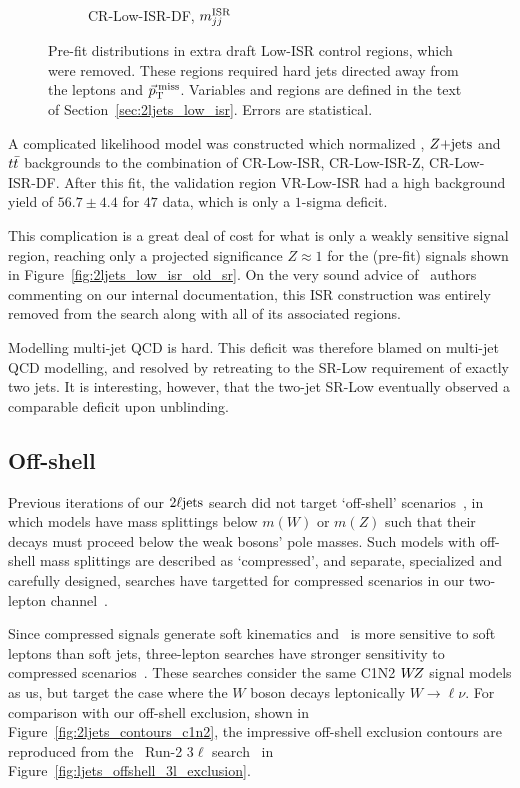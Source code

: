 \begin{figure}[tp]
\begin{subfigure}{0.48\textwidth}
\caption{CR-Low-ISR-DF, $m_{jj}^\mathrm{ISR}$}
\end{subfigure}
\caption[
Pre-fit distributions in extra draft Low-ISR control regions, which were
removed
]{%
Pre-fit distributions in extra draft Low-ISR control regions, which were
removed.
These regions required hard jets directed away from the leptons and $\vec p_\mathrm{T}^\mathrm{\:miss}$.
Variables and regions are defined in the text of
Section~\ref{sec:2ljets_low_isr}.
Errors are statistical.
}
\label{fig:2ljets_low_isr_old_more}
\end{figure}

A complicated likelihood model was constructed which normalized \diboson,
$Z\mathrm{+jets}$ and $t\bar t$ backgrounds to the combination of CR-Low-ISR,
CR-Low-ISR-Z, CR-Low-ISR-DF.
After this fit, the validation region VR-Low-ISR had a high background yield
of $56.7 \pm 4.4$ for $47$ data, which is only a $1$-sigma deficit.

This complication is a great deal of cost for what is only a weakly sensitive
signal region, reaching only a projected significance $Z\approx 1$ for the
(pre-fit) signals shown in Figure~\ref{fig:2ljets_low_isr_old_sr}.
On the very sound advice of \atlas\ authors commenting on our internal
documentation, this ISR construction was entirely removed from the search
along with all of its associated regions.

Modelling multi-jet QCD is hard.
This deficit was therefore blamed on multi-jet QCD modelling, and resolved by
retreating to the SR-Low requirement of exactly two jets.
It is interesting, however, that the two-jet SR-Low eventually observed a
comparable deficit upon unblinding.


\subsection{Off-shell}
\label{sec:2ljets_offshell}
Previous iterations of our $2\ell\mathrm{jets}$ search did not target `off-shell'
scenarios~\cite{atlas_23l_SUSY_2016_24, atlas_2l_SUSY_2013_11}, in which
models have mass splittings below $m(W)$ or $m(Z)$ such that their decays must
proceed below the weak bosons' pole masses.
Such models with off-shell mass splittings are described as
`compressed', and separate, specialized and carefully designed, searches
have targetted for compressed scenarios in our two-lepton channel~\cite{
atlas_susy_compressed_2l_2016_partial_run2,
atlas_susy_compressed_2l_2018_run2
}.

Since compressed signals generate soft kinematics and \atlas\ is more sensitive
to soft leptons than soft jets, three-lepton searches have stronger sensitivity
to compressed scenarios~\cite{atlas_rjr_3l_SUSY_2019_09}.
These searches consider the same C1N2 $W\kern-0.4exZ$ signal models as us, but target the
case where the $W$ boson decays leptonically $W\to\ell\nu$.
For comparison with our off-shell exclusion,
shown in Figure~\ref{fig:2ljets_contours_c1n2},
the impressive off-shell exclusion contours are reproduced
from the \atlas\ Run-2 $3\ell$ search~\cite{atlas_rjr_3l_SUSY_2019_09} in
Figure~\ref{fig:ljets_offshell_3l_exclusion}.

